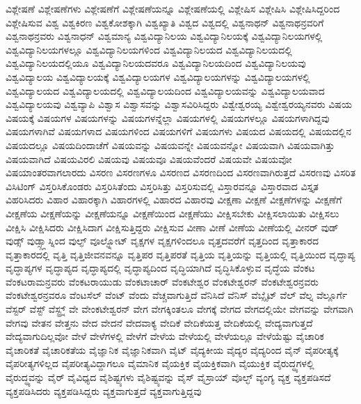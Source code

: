 {ವಿಶ್ಲೇಷಣೆ
ವಿಶ್ಲೇಷಣೆಗಳು
ವಿಶ್ಲೇಷಣೆಗೆ
ವಿಶ್ಲೇಷಣೆಯನ್ನೂ
ವಿಶ್ಲೇಷಣೆಯಲ್ಲಿ
ವಿಶ್ಲೇಷಿಸ
ವಿಶ್ಲೇಷಿಸಿ
ವಿಶ್ಲೇಷಿಸಿದ್ದರಿಂದ
ವಿಶ್ಲೇಷಿಸುವ
ವಿಶ್ವ
ವಿಶ್ವಕಿರಣ
ವಿಶ್ವಕೋಶಕ್ಕಾಗಿ
ವಿಶ್ವಖ್ಯಾತಿ
ವಿಶ್ವದ
ವಿಶ್ವದಲ್ಲಿ
ವಿಶ್ವನಾಥನ್
ವಿಶ್ವನಾಥನ್ರವರಿಗೆ
ವಿಶ್ವನಾಥನ್ರವರು
ವಿಶ್ವನಾಧನ್
ವಿಶ್ವಮಾನ್ಯ
ವಿಶ್ವವಿದ್ಯಾನಿಲಯ
ವಿಶ್ವವಿದ್ಯಾನಿಲಯಕ್ಕೆ
ವಿಶ್ವವಿದ್ಯಾನಿಲಯಗಳಲ್ಲಿ
ವಿಶ್ವವಿದ್ಯಾನಿಲಯಗಳಲ್ಲೂ
ವಿಶ್ವವಿದ್ಯಾನಿಲಯಗಳಿಂದ
ವಿಶ್ವವಿದ್ಯಾನಿಲಯದ
ವಿಶ್ವವಿದ್ಯಾನಿಲಯದಲ್ಲಿ
ವಿಶ್ವವಿದ್ಯಾನಿಲಯದಲ್ಲಿಯೂ
ವಿಶ್ವವಿದ್ಯಾನಿಲಯದವರೂ
ವಿಶ್ವವಿದ್ಯಾನಿಲಯದಿಂದ
ವಿಶ್ವವಿದ್ಯಾನಿಲಯವು
ವಿಶ್ವವಿದ್ಯಾಲಯ
ವಿಶ್ವವಿದ್ಯಾಲಯಕ್ಕೆ
ವಿಶ್ವವಿದ್ಯಾಲಯಗಳ
ವಿಶ್ವವಿದ್ಯಾಲಯಗಳನ್ನು
ವಿಶ್ವವಿದ್ಯಾಲಯಗಳಲ್ಲಿ
ವಿಶ್ವವಿದ್ಯಾಲಯದ
ವಿಶ್ವವಿದ್ಯಾಲಯದಲ್ಲಿ
ವಿಶ್ವವಿದ್ಯಾಲಯದಿಂದ
ವಿಶ್ವವಿದ್ಯಾಲಯವನ್ನು
ವಿಶ್ವವಿದ್ಯಾಲಯವಾದ
ವಿಶ್ವವಿದ್ಯಾಲಯವು
ವಿಶ್ವವ್ಯಾಪಿ
ವಿಶ್ವಾಸ
ವಿಶ್ವಾಸವನ್ನು
ವಿಶ್ವಾಸವಿರಿಸಿದ್ದರು
ವಿಶ್ವೇಶ್ವರಯ್ಯ
ವಿಶ್ವೇಶ್ವರಯ್ಯನವರು
ವಿಷಯ
ವಿಷಯಕ್ಕೆ
ವಿಷಯಗಳ
ವಿಷಯಗಳನ್ನು
ವಿಷಯಗಳನ್ನೆಲ್ಲಾ
ವಿಷಯಗಳಲ್ಲಿ
ವಿಷಯಗಳಲ್ಲೂ
ವಿಷಯಗಳಾಗಿದ್ದವು
ವಿಷಯಗಳಾಗಿವೆ
ವಿಷಯಗಳಾದ
ವಿಷಯಗಳಿಂದ
ವಿಷಯಗಳಿಗೆ
ವಿಷಯಗಳು
ವಿಷಯದ
ವಿಷಯದಲ್ಲಿ
ವಿಷಯದಲ್ಲಿನ
ವಿಷಯದಲ್ಲೂ
ವಿಷಯದಿಂದಾಚೆಗೆ
ವಿಷಯವನ್ನು
ವಿಷಯವನ್ನೇ
ವಿಷಯವನ್ನೋ
ವಿಷಯವಾಗಿ
ವಿಷಯವಾಗಿತ್ತು
ವಿಷಯವಾಗಿದೆ
ವಿಷಯವಿರಲಿ
ವಿಷಯವು
ವಿಷಯವೂ
ವಿಷಯವೆಂದರೆ
ವಿಷಯವೇ
ವಿಷಯವೋ
ವಿಷಯಾಂತರವಾಗಲಾರದು
ವಿಸರಣ
ವಿಸರಣಗಳೂ
ವಿಸರಣದ
ವಿಸರಣದಿಂದ
ವಿಸರಣವಾಗಿರುತ್ತದೆ
ವಿಸರಣವು
ವಿಸರಿತ
ವಿಸಿಟಿಂಗ್
ವಿಸ್ತರಿಸಿಕೊಂಡರು
ವಿಸ್ತರಿಸಿತೆಂದು
ವಿಸ್ತರಿಸಿತ್ತು
ವಿಸ್ತರಿಸುವಲ್ಲಿ
ವಿಸ್ತಾರವನ್ನೂ
ವಿಸ್ತಾರವಾದ
ವಿಸ್ತೃತ
ವಿಹರಿಸಿದರು
ವಿಹಾರ
ವಿಹಾರಕ್ಕಾಗಿ
ವಿಹಾರಗಳಲ್ಲಿ
ವಿಹಾರದ
ವಿಹಾರವು
ವೀಕ್ಷಣಾ
ವೀಕ್ಷಣೆ
ವೀಕ್ಷಣೆಗಳನ್ನು
ವೀಕ್ಷಣೆಗೆ
ವೀಕ್ಷಣೆಯ
ವೀಕ್ಷಣೆಯನ್ನು
ವೀಕ್ಷಣೆಯನ್ನೂ
ವೀಕ್ಷಣೆಯಿಂದ
ವೀಕ್ಷಣೆಯು
ವೀಕ್ಷಿಸಬೇಕು
ವೀಕ್ಷಿಸಲಾಯಿತು
ವೀಕ್ಷಿಸಲು
ವೀಕ್ಷಿಸಿ
ವೀಕ್ಷಿಸಿದರು
ವೀಕ್ಷಿಸಿದಾಗ
ವೀಕ್ಷಿಸುತ್ತಿದ್ದರು
ವೀಕ್ಷಿಸುವ
ವೀಣಾ
ವೀಣೆ
ವೀಣೆಯ
ವೀಣೆಯಲ್ಲಿ
ವೀನರ್
ವುಡ್
ವುಡ್ಸ್
ವುಡ್ಸ್ಗ್ಲಾಸ್ನಿಂದ
ವುಲ್ಫ್
ವೂಲ್ಫ್ನೋಟ್
ವೃಕ್ಷಗಳ
ವೃಕ್ಷಗಳಿಂದಲೂ
ವೃತ್ತದವರೆಗೆ
ವೃತ್ತದಿಂದ
ವೃತ್ತಾಕಾರದ
ವೃತ್ತಾಕಾರದಲ್ಲಿ
ವೃತ್ತಿ
ವೃತ್ತಿಜೀವನವನ್ನೂ
ವೃತ್ತಿಪರ
ವೃತ್ತಿಪರತೆ
ವೃತ್ತಿಯ
ವೃತ್ತಿಯನ್ನು
ವೃತ್ತಿಯಲ್ಲಿ
ವೃತ್ತಿಯಿಂದ
ವೃದ್ಧಾಪ್ಯ
ವೃದ್ಧಾಪ್ಯಗಳ
ವೃದ್ಧಾಪ್ಯದ
ವೃದ್ಧಾಪ್ಯದಲ್ಲಿ
ವೃದ್ಧಾಪ್ಯದಿಂದ
ವೃದ್ಧಿಯಾಗಿದೆ
ವೃದ್ಧಿಸಿಕೊಳ್ಳುವ
ವೃದ್ಧೆಯ
ವೆಂಕಟ
ವೆಂಕಟರಾಮನ್ರವರು
ವೆಂಕಟರಾಯುಡು
ವೆಂಕಟಾಚಾರ್
ವೆಂಕಟೇಶ್ವರ
ವೆಂಕಟೇಶ್ವರನ್
ವೆಂಕಟೇಶ್ವರನ್ರವರು
ವೆಂಕಟೇಶ್ವರನ್ರವರೂ
ವೆಂಟಸೆಲ್
ವೆಂಟ್
ವೆಂದು
ವೆಚ್ಚವಾಗುತ್ತಿದೆ
ವೆನಿಸಿದೆ
ವೆನಿಸ್
ವೆಬ್ಸೈಟ್
ವೆಲ್
ವೆಲ್ನ
ವೆಲ್ಲೂರ್ಗೆ
ವೆಸ್ಟರ್
ವೆಸ್ಟ್
ವೆಸ್ಟ್ರ್ನ್
ವೇ
ವೇಂಕಟೇಶ್ವರನ್
ವೇಗ
ವೇಗಕ್ಕಿಂತಲೂ
ವೇಗಕ್ಕೆ
ವೇಗದ
ವೇಗದಲ್ಲಿಯೇ
ವೇಗವನ್ನು
ವೇಗವಾಗಿ
ವೇಗವು
ವೇತನ
ವೇತ್ತನು
ವೇದ
ವೇದನೆ
ವೇದವಾಕ್ಯ
ವೇದಿಕೆ
ವೇದಿಕೆಯತ್ತ
ವೇದಿಕೆಯಲ್ಲಿ
ವೇದ್ಯವಾಗುತ್ತದೆ
ವೇದ್ಯವಾಗುದಿಲ್ಲವೋ
ವೇಳೆ
ವೇಳೆಗಳಲ್ಲಿ
ವೇಳೆಗೆ
ವೇಳೆಯ
ವೇಳೆಯಲ್ಲಿ
ವೇಳೆಯಲ್ಲೂ
ವೇಳೆಯೆಷ್ಟು
ವೈಚಾರಿಕ
ವೈಚಾರಿಕತೆ
ವೈಚಾರಿಕತೆಯ
ವೈಜ್ಞಾನಿಕ
ವೈಜ್ಞಾನಿಕವಾಗಿ
ವೈಟ್
ವೈದ್ಯಕೀಯ
ವೈದ್ಯರ
ವೈದ್ಯರಿಂದ
ವೈನ್
ವೈಪರೀತ್ಯಕ್ಕೆ
ವೈಪರೀತ್ಯಗಳಿಲ್ಲದ
ವೈಪರೀತ್ಯವಿದ್ದಾಗಲೂ
ವೈಮಾನಿಕ
ವೈಯಕ್ತಿಕ
ವೈಯಕ್ತಿಕವಾಗಿ
ವೈಯುಕ್ತಿಕ
ವೈರುದ್ಧ್ಯಗಳಲ್ಲಿ
ವೈರುದ್ಧ್ಯವನ್ನು
ವೈರ್
ವೈವಿಧ್ಯದ
ವೈಶಿಷ್ಟ್ಯಗಳು
ವೈಶಿಷ್ಟ್ಯವನ್ನು
ವೈಸ್
ವೈಸ್ರಾಯ್
ವೊಲ್ಛ್
ವ್ಯಂಗ್ಯ
ವ್ಯಕ್ತ
ವ್ಯಕ್ತಪಡಿಸದೆ
ವ್ಯಕ್ತಪಡಿಸಿದರು
ವ್ಯಕ್ತಪಡಿಸಿದ್ದರು
ವ್ಯಕ್ತವಾಗುತ್ತದೆ
ವ್ಯಕ್ತವಾಗುತ್ತಿದ್ದವು
}
